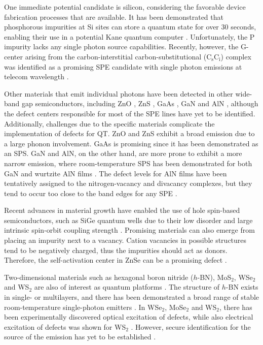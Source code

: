 One immediate potential candidate is silicon, considering the favorable device fabrication processes that are available. It has been demonstrated that phosphorous impurities at Si sites can store a quantum state for over $30$ seconds, enabling their use in a potential Kane quantum computer \cite{Kane1998, Zhang2020}. Unfortunately, the P impurity lacks any single photon source capabilities. Recently, however, the G-center arising from the carbon-interstitial carbon-substitutional ($\text{C}_{\text{s}}\text{C}_{\text{i}}$) complex was identified as a promising SPE candidate with single photon emissions at telecom wavelength \cite{Redjem2020}.

Other materials that emit individual photons have been detected in other wide-band gap semiconductors, including ZnO \cite{Zheng2014, Morfa2012}, ZnS \cite{Stewart2019}, GaAs \cite{Bluhm2010}, GaN \cite{Roux2017, Gammon1996} and AlN \cite{Chung2018, Wang2014}, although the defect centers responsible for most of the SPE lines have yet to be identified.
Additionally, challenges due to the specific materials complicate the implementation of defects for QT. ZnO and ZnS exhibit a broad emission due to a large phonon involvement. GaAs is promising since it has been demonstrated as an SPS.
GaN and AlN, on the other hand, are more prone to exhibit a more narrow emission, where room-temperature SPS has been demonstrated for both GaN \cite{Berhane2018} and wurtzite AlN films \cite{Xue2020}. The defect levels for AlN films have been tentatively assigned to the nitrogen-vacancy and divacancy complexes, but they tend to occur too close to the band edges for any SPE \cite{Zhang2020, Varley2016}.

Recent advances in material growth have enabled the use of hole spin-based semiconductors, such as SiGe quantum wells due to their low disorder and large intrinsic spin-orbit coupling strength \cite{Hardy2019}. Promising materials can also emerge from placing an impurity next to a vacancy. Cation vacancies in possible structures tend to be negatively charged, thus the impurities should act as donors. Therefore, the self-activation center in ZnSe can be a promising defect \cite{Weber2010}.

Two-dimensional materials such as hexagonal boron nitride ($h$-BN), MoS$_2$, WSe$_2$ and WS$_2$ are also of interest as quantum platforms \cite{Toth2019, Atatuere2018}. The structure of $h$-BN exists in single- or multilayers, and there has been demonstrated a broad range of stable room-temperature single-photon emitters \cite{Tran2016, Tran2016a}. In WSe$_2$, MoSe$_2$ and WS$_2$, there has been experimentally discovered optical excitation of defects, while also electrical excitation of defects was shown for WS$_2$ \cite{Atatuere2018}. However, secure identification for the source of the emission has yet to be established \cite{Weston2018, Abdi2018, Atatuere2018}.

